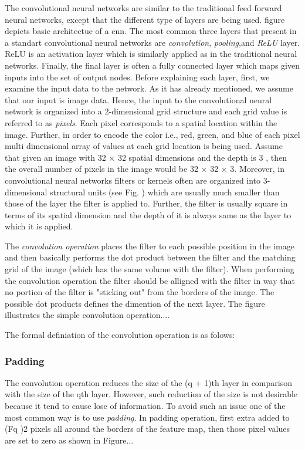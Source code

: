 The convolutional neural networks are similar to the traditional feed forward neural networks, except that the different type of layers are being used. figure depicts basic architectue of a cnn. The most common three layers that present in a standart convolutional neural networks are \textit{convolution}, \textit{pooling},and \textit{ReLU} layer. ReLU is an activation layer which is similarly applied as in the traditional neural networks. Finally, the final layer is often a fully connected layer which maps given inputs into the set of output nodes. Before explaining each layer, first, we examine the input data to the network. As it has already mentioned, we assume that our input is image data. Hence, the input to the convolutional neural network is organized into a 2-dimensional grid structure and each grid value is referred to as \textit{pixels}. Each pixel corresponds to a spatial location within the image. Further, in order to encode the color i.e., red, green, and blue of each pixel multi dimensional array of values at each grid location is being used. Assume that given an image with 32 × 32 spatial dimensions and the depth is 3 , then the overall number of pixels in the image would be 32 × 32 × 3. Moreover, in convolutional neural networks filters or kernels often are organized into 3-dimensional structural units (see Fig. ) which are usually much smaller than those of the layer the filter is applied to. Further, the filter is usually square in terms of its spatial dimension and the depth of it is always same as the layer to which it is applied. 

The \textit{convolution operation} places the filter to each possible position in the image and then basically performs the dot product between the filter and the matching grid of the image (which has the same volume with the filter). When performing the convolution operation the filter should be alligned with the filter in way that no portion of the filter is "sticking out" from the borders of the image. The possible dot products defines the dimention of the next layer. The figure illustrates the simple convolution  operation....

The formal definiation of the convolution operation is as folows:

\subsubsection{Padding}
The convolution operation reduces the size of the (q + 1)th layer in comparison with the size of the qth layer. However, such reduction of the size is not desirable because it tend to cause lose of information.  To avoid such an issue one of the most common way is to use \textit{padding}. In padding operation, first extra added to (Fq )\/2 pixels all around the borders of the feature map, then those pixel values are set to zero as shown in Figure... 

